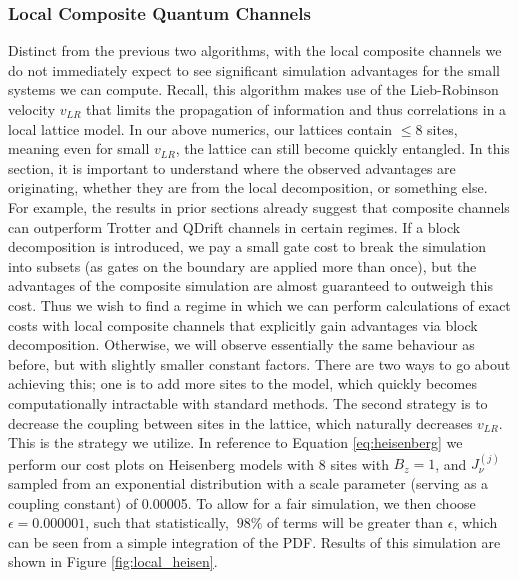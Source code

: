 \subsubsection{Local Composite Quantum Channels}
Distinct from the previous two algorithms, with the local composite channels we do not immediately expect to see significant simulation advantages for the small systems we can compute. Recall, this algorithm makes use of the Lieb-Robinson velocity $v_{LR}$ that limits the propagation of information and thus correlations in a local lattice model. In our above numerics, our lattices contain $\leq 8$ sites, meaning even for small $v_{LR}$, the lattice can still become quickly entangled. In this section, it is important to understand where the observed advantages are originating, whether they are from the local decomposition, or something else. For example, the results in prior sections already suggest that composite channels can outperform Trotter and QDrift channels in certain regimes. If a block decomposition is introduced, we pay a small gate cost to break the simulation into subsets (as gates on the boundary are applied more than once), but the advantages of the composite simulation are almost guaranteed to outweigh this cost. Thus we wish to find a regime in which we can perform calculations of exact costs with local composite channels that explicitly gain advantages via block decomposition. Otherwise, we will observe essentially the same behaviour as before, but with slightly smaller constant factors. There are two ways to go about achieving this; one is to add more sites to the model, which quickly becomes computationally intractable with standard methods. The second strategy is to decrease the coupling between sites in the lattice, which naturally decreases $v_{LR}$. This is the strategy we utilize. In reference to Equation \ref{eq:heisenberg} we perform our cost plots on Heisenberg models with 8 sites with $B_z = 1$, and $J_\nu^{(j)}$ sampled from an exponential distribution with a scale parameter (serving as a coupling constant) of 0.00005. To allow for a fair simulation, we then choose $\epsilon = 0.000001$, such that statistically, $~98\% $ of terms will be greater than $\epsilon$, which can be seen from a simple integration of the PDF. Results of this simulation are shown in Figure \ref{fig:local_heisen}.  \\

